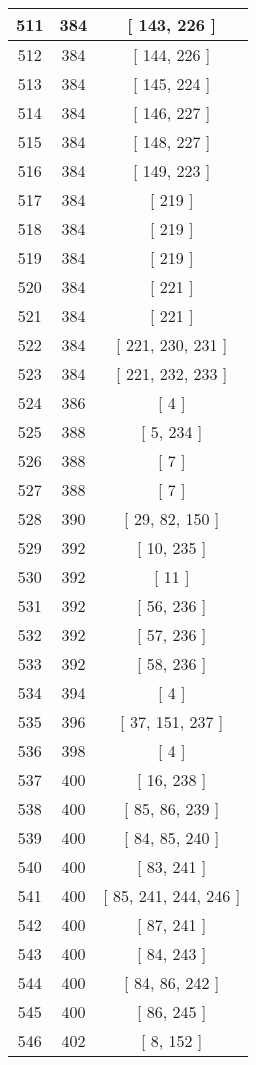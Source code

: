 \begin{center}
\begin{longtable}[H]{|| c c c ||}
511 & 384 & [ 143, 226 ]
\\\hline
512 & 384 & [ 144, 226 ]
\\\hline
513 & 384 & [ 145, 224 ]
\\\hline
514 & 384 & [ 146, 227 ]
\\\hline
515 & 384 & [ 148, 227 ]
\\\hline
516 & 384 & [ 149, 223 ]
\\\hline
517 & 384 & [ 219 ]
\\\hline
518 & 384 & [ 219 ]
\\\hline
519 & 384 & [ 219 ]
\\\hline
520 & 384 & [ 221 ]
\\\hline
521 & 384 & [ 221 ]
\\\hline
522 & 384 & [ 221, 230, 231 ]
\\\hline
523 & 384 & [ 221, 232, 233 ]
\\\hline
524 & 386 & [ 4 ]
\\\hline
525 & 388 & [ 5, 234 ]
\\\hline
526 & 388 & [ 7 ]
\\\hline
527 & 388 & [ 7 ]
\\\hline
528 & 390 & [ 29, 82, 150 ]
\\\hline
529 & 392 & [ 10, 235 ]
\\\hline
530 & 392 & [ 11 ]
\\\hline
531 & 392 & [ 56, 236 ]
\\\hline
532 & 392 & [ 57, 236 ]
\\\hline
533 & 392 & [ 58, 236 ]
\\\hline
534 & 394 & [ 4 ]
\\\hline
535 & 396 & [ 37, 151, 237 ]
\\\hline
536 & 398 & [ 4 ]
\\\hline
537 & 400 & [ 16, 238 ]
\\\hline
538 & 400 & [ 85, 86, 239 ]
\\\hline
539 & 400 & [ 84, 85, 240 ]
\\\hline
540 & 400 & [ 83, 241 ]
\\\hline
541 & 400 & [ 85, 241, 244, 246 ]
\\\hline
542 & 400 & [ 87, 241 ]
\\\hline
543 & 400 & [ 84, 243 ]
\\\hline
544 & 400 & [ 84, 86, 242 ]
\\\hline
545 & 400 & [ 86, 245 ]
\\\hline
546 & 402 & [ 8, 152 ]
\\\hline

\end{longtable}
\end{center}
